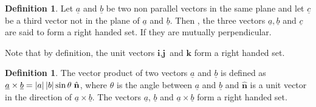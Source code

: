 \documentclass[11pt,a4paper]{article}
\theoremstyle{definition}
\newtheorem{defn}[thm]{Definition}
\begin{document}
\begin{defn}


Let $\underline{a}$ and $\underline{b}$ be two non parallel vectors in the same plane and let $\underline{c}$ be a third vector not in the plane of $\underline{a}$ and $\underline{b}$. Then , the three vectors $\underline{a}, \underline{b}$ and $\underline{c}$ are said to form a right handed set. If they are mutually perpendicular.


\begin{figure}[H]
\centering
{}
\end{figure}

Note that by definition, the unit vectors $\textbf{i}, \textbf{j}$ and $\textbf{k}$ form a right handed set.


\begin{figure}[H]
\centering
{}
\end{figure}
\end{defn}

\begin{defn}


The vector product of two vectors $\underline{a}$ and $\underline{b}$ is defined as $\underline{a} \times \underline{b} = \left|a\right|\left|b\right|\sin \theta\hspace{0.1cm} \hat{\textbf{n}}$, where $\theta$ is the angle between $\underline{a}$  and $\underline{b}$ and $\hat{\textbf{n}}$ is a unit vector in the direction of $\underline{a} \times \underline{b}$. The vectors $\underline{a}$, $\underline{b}$ and $\underline{a} \times \underline{b}$ form a right handed set.\\
\end{defn}
\end{document}
